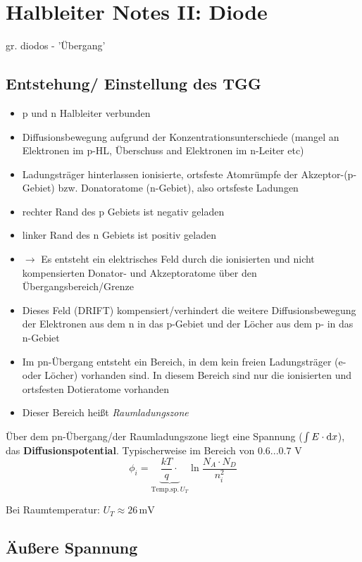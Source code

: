 \documentclass[a4paper, 12pt]{article}
\begin{document}
\section*{Halbleiter Notes II: Diode}
gr. diodos -  'Übergang'
\subsection*{Entstehung/ Einstellung des TGG}
\begin{itemize}
\item p und n Halbleiter verbunden
  \item Diffusionsbewegung aufgrund der Konzentrationsunterschiede (mangel an
    Elektronen im p-HL, Überschuss and Elektronen im n-Leiter etc)
  \item Ladungsträger hinterlassen ionisierte, ortsfeste Atomrümpfe der
    Akzeptor-(p-Gebiet) bzw. Donatoratome (n-Gebiet), also ortsfeste Ladungen
    \item rechter Rand des p Gebiets ist negativ geladen
      \item linker Rand des n Gebiets ist positiv geladen
    \item $\rightarrow$ Es entsteht ein elektrisches Feld durch die ionisierten
      und nicht kompensierten Donator- und Akzeptoratome über den
      Übergangsbereich/Grenze 
    \item Dieses Feld (DRIFT) kompensiert/verhindert die weitere Diffusionsbewegung der
      Elektronen aus dem n in das p-Gebiet und der Löcher aus dem p- in das n-Gebiet
    \item Im pn-Übergang entsteht ein Bereich, in dem kein freien Ladungsträger
      (e- oder Löcher) vorhanden sind. In diesem Bereich sind nur die
      ionisierten und ortsfesten Dotieratome vorhanden
    \item Dieser Bereich heißt \emph{Raumladungszone}
\end{itemize}

Über dem pn-Übergang/der Raumladungszone liegt eine Spannung ($\int E \cdot \mathop{}\!\mathrm{d}
x$), das \textbf{Diffusionspotential}. Typischerweise im Bereich von $0.6...0.7$ V
\[\phi_i = \underbrace{\frac{k T}{q} \cdot }_{\textrm{Temp.sp.}\, U_T}  \ln{ \frac{N_A \cdot N_D}{n_i^2} }\]

Bei Raumtemperatur: $U_T \approx 26 \, \si{\milli\volt}$

\holine{\textwidth}
\subsection*{Äußere Spannung}
\end{document}
